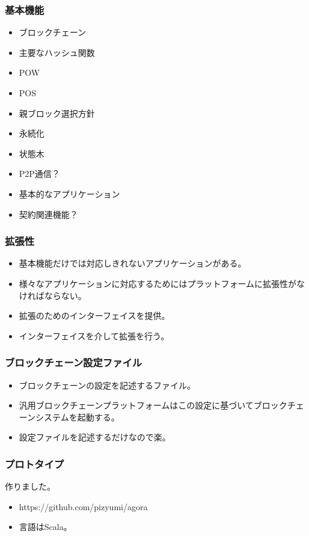 \documentclass[dvipdfmx,9pt,notheorems]{beamer}
\theoremstyle{definition}
\begin{document}
\begin{frame}\frametitle{基本機能}
\begin{itemize}
 \item ブロックチェーン
 \item 主要なハッシュ関数
 \item POW
 \item POS
 \item 親ブロック選択方針
 \item 永続化
 \item 状態木
 \item P2P通信？
 \item 基本的なアプリケーション
 \item 契約関連機能？
\end{itemize}
\end{frame}

\begin{frame}\frametitle{拡張性}
\begin{itemize}
 \item 基本機能だけでは対応しきれないアプリケーションがある。
 \item 様々なアプリケーションに対応するためにはプラットフォームに拡張性がなければならない。
\end{itemize}
\begin{itemize}
 \item 拡張のためのインターフェイスを提供。
 \item インターフェイスを介して拡張を行う。
\end{itemize}
\end{frame}

\begin{frame}\frametitle{ブロックチェーン設定ファイル}
\begin{itemize}
 \item ブロックチェーンの設定を記述するファイル。
 \item 汎用ブロックチェーンプラットフォームはこの設定に基づいてブロックチェーンシステムを起動する。
\end{itemize}
\begin{itemize}
 \item 設定ファイルを記述するだけなので楽。
\end{itemize}
\end{frame}

\begin{frame}\frametitle{プロトタイプ}
作りました。
\begin{itemize}
 \item https://github.com/pizyumi/agora
 \item 言語はScala。
\end{itemize}
\end{frame}
\end{document}

